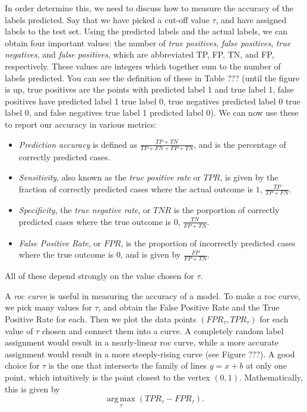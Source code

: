 In order determine this, we need to discuss how to measure the accuracy of the labels predicted.  Say that we have picked a cut-off value $\tau$, and have assigned labels to the test set.  Using the predicted labels and the actual labels, we can obtain four important values: the number of \emph{true positives}, \emph{false positives}, \emph{true negatives}, and \emph{false positives}, which are abbreviated TP, FP, TN, and FP, respectively.  These values are integers which together sum to the number of labels predicted.  You can see the definition of these in Table ??? (until the figure is up, true positives are the points with predicted label 1 and true label 1, false positives have predicted label 1 true label 0, true negatives predicted label 0 true label 0, and false negatives true label 1 predicted label 0).  We can now use these to report our accuracy in various metrics:
\begin{itemize}
\item \emph{Prediction accuracy} is defined as $\frac{TP+TN}{TP+FN+FP+TN}$, and is the percentage of correctly predicted cases.
\item \emph{Sensitivity}, also known as the \emph{true positive rate} or $TPR$, is given by the fraction of correctly predicted cases where the actual outcome is $1$, $\frac{TP}{TP+FN}$.
\item \emph{Specificity}, the \emph{true negative rate}, or $TNR$ is the porportion of correctly predicted cases where the true outcome is $0$, $\frac{TN}{FP+TN}$.
\item \emph{False Positive Rate}, or $FPR$, is the proportion of incorrectly predicted cases where the true outcome is $0$, and is given by $\frac{FP}{FP+TN}$.
\end{itemize}
All of these depend strongly on the value chosen for $\tau$.

A \emph{roc curve} is useful in measuring the accuracy of a model.  To make a roc curve, we pick many values for $\tau$, and obtain the False Positive Rate and the True Positive Rate for each.  Then we plot the data points  $(FPR_{\tau},TPR_{\tau})$ for each value of $\tau$ chosen and connect them into a curve.  A completely random label assignment would result in a nearly-linear roc curve, while a more accurate assignment would result in a more steeply-rising curve (see Figure ???).  A good choice for $\tau$ is the one that intersects the family of lines $y=x+b$ at only one point, which intuitively is the point closest to the vertex $(0, 1)$.  Mathematically, this is given by
\begin{equation}
\operatorname*{arg\,max}_{\tau} (TPR_{\tau} - FPR_{\tau}).
\end{equation}

